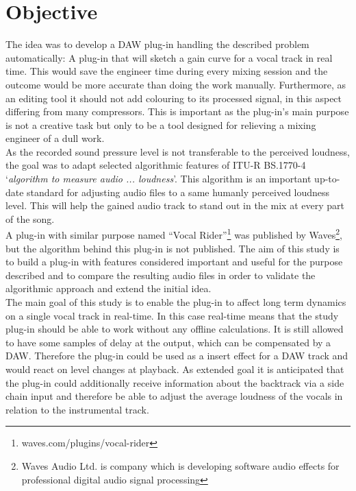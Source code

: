 \section{Objective}

The idea was to develop a DAW plug-in handling the described problem automatically: A plug-in that will sketch a gain curve for a vocal track in real time. This would save the engineer time during every mixing session and the outcome would be more accurate than doing the work manually. Furthermore, as an editing tool it should not add colouring to its processed signal, in this aspect differing from many compressors. This is important as the plug-in's main purpose is not a creative task but only to be a tool designed for relieving a mixing engineer of a dull work.\\
As the recorded sound pressure level is not transferable to the perceived loudness, the goal was to adapt selected algorithmic features of ITU-R BS.1770-4\cite{ITUalgo} ‘\textit{algorithm to measure audio ... loudness}’. This algorithm is an important up-to-date standard for adjusting audio files to a same humanly perceived loudness level. This will help the gained audio track to stand out in the mix at every part of the song.\\
A plug-in with similar purpose named “Vocal Rider”\footnote{waves.com/plugins/vocal-rider} was published by Waves\footnote{Waves Audio Ltd. is company which is developing software audio effects for professional digital audio signal processing}, but the algorithm behind this plug-in is not published. The aim of this study is to build a plug-in with features considered important and useful for the purpose described and to compare the resulting audio files in order to validate the algorithmic approach and extend the initial idea.\\
The main goal of this study is to enable the plug-in to affect long term dynamics on a single vocal track in real-time. In this case real-time means that the study plug-in should be able to work without any offline calculations. It is still allowed to have some samples of delay at the output, which can be compensated by a DAW. Therefore the plug-in could be used as a insert effect for a DAW track and would react on level changes at playback. As extended goal it is anticipated that the plug-in could additionally receive information about the backtrack via a side chain input and therefore be able to adjust the average loudness of the vocals in relation to the instrumental track.\\

